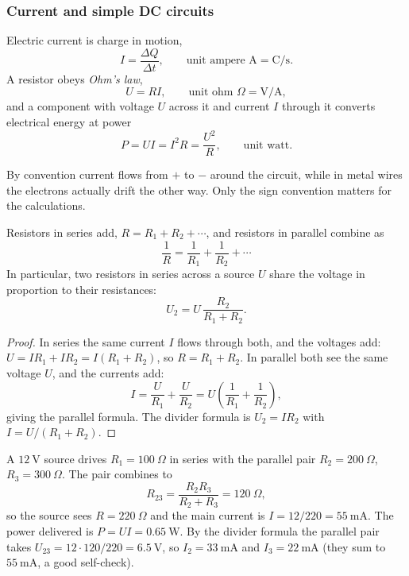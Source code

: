 \subsubsection{Current and simple DC circuits}

\begin{definition}\label{def:current}
Electric current is charge in motion,
\[
  I = \frac{\Delta Q}{\Delta t}, \qquad \text{unit ampere } \mathrm{A} = \mathrm{C/s}.
\]
A resistor obeys \emph{Ohm's law},
\[
  U = RI, \qquad \text{unit ohm } \Omega = \mathrm{V/A},
\]
and a component with voltage $U$ across it and current $I$ through it converts electrical energy at power
\[
  P = UI = I^{2}R = \frac{U^{2}}{R}, \qquad \text{unit watt}.
\]
\end{definition}

By convention current flows from $+$ to $-$ around the circuit, while in metal wires the electrons actually drift the other way. Only the sign convention matters for the calculations.

\begin{proposition}\label{prop:series-parallel}
Resistors in series add, $R = R_1 + R_2 + \cdots$, and resistors in parallel combine as
\[
  \frac{1}{R} = \frac{1}{R_1} + \frac{1}{R_2} + \cdots
\]
In particular, two resistors in series across a source $U$ share the voltage in proportion to their resistances:
\begin{equation}\label{eq:divider}
  U_2 = U\,\frac{R_2}{R_1 + R_2}.
\end{equation}
\end{proposition}

\begin{proof}
In series the same current $I$ flows through both, and the voltages add: $U = IR_1 + IR_2 = I(R_1 + R_2)$, so $R = R_1 + R_2$. In parallel both see the same voltage $U$, and the currents add:
\[
  I = \frac{U}{R_1} + \frac{U}{R_2} = U\left(\frac{1}{R_1} + \frac{1}{R_2}\right),
\]
giving the parallel formula. The divider formula is $U_2 = IR_2$ with $I = U/(R_1 + R_2)$.
\end{proof}

\begin{example}\label{exm:network}
A $12\ \mathrm{V}$ source drives $R_1 = 100\ \Omega$ in series with the parallel pair $R_2 = 200\ \Omega$, $R_3 = 300\ \Omega$. The pair combines to
\[
  R_{23} = \frac{R_2 R_3}{R_2 + R_3} = 120\ \Omega,
\]
so the source sees $R = 220\ \Omega$ and the main current is $I = 12/220 = 55\ \mathrm{mA}$. The power delivered is $P = UI = 0.65\ \mathrm{W}$. By the divider formula the parallel pair takes $U_{23} = 12\cdot 120/220 = 6.5\ \mathrm{V}$, so $I_2 = 33\ \mathrm{mA}$ and $I_3 = 22\ \mathrm{mA}$ (they sum to $55\ \mathrm{mA}$, a good self-check).
\end{example}

